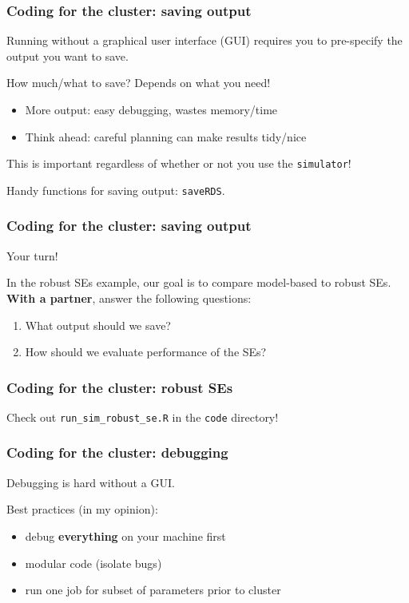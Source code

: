 \documentclass[12pt, 
hyperref={colorlinks=true, linkcolor=BlueViolet, urlcolor=BlueViolet},dvipsnames]{beamer}
\begin{document}
\begin{frame}
\frametitle{Coding for the cluster: saving output}

Running without a graphical user interface (GUI) requires you to pre-specify the output you want to save.

How much/what to save? \pause Depends on what you need! \vspace{-0.3cm} \pause
\begin{itemize}
\item More output: easy debugging, wastes memory/time \pause
\item Think ahead: careful planning can make results tidy/nice \pause
\end{itemize}

This is important regardless of whether or not you use the \texttt{simulator}!

Handy functions for saving output: \texttt{saveRDS}.
\end{frame}

\begin{frame}
\frametitle{Coding for the cluster: saving output}

Your turn!

In the robust SEs example, our goal is to compare model-based to robust SEs. \textbf{With a partner}, answer the following questions: \vspace{-0.3cm}
\begin{enumerate}
\item What output should we save?
\item How should we evaluate performance of the SEs? 
\end{enumerate}
\end{frame}

\begin{frame}
\frametitle{Coding for the cluster: robust SEs}

Check out \texttt{run\_sim\_robust\_se.R} in the \texttt{code} directory!

\end{frame}

\begin{frame}
\frametitle{Coding for the cluster: debugging}

Debugging is hard without a GUI. \pause

Best practices (in my opinion): \vspace{-0.3cm} \pause
\begin{itemize}
\item debug \textbf{everything} on your machine first \pause
\item modular code \pause (isolate bugs) \pause
\item run one job for subset of parameters prior to cluster
\end{itemize}

\end{frame}
\end{document}
